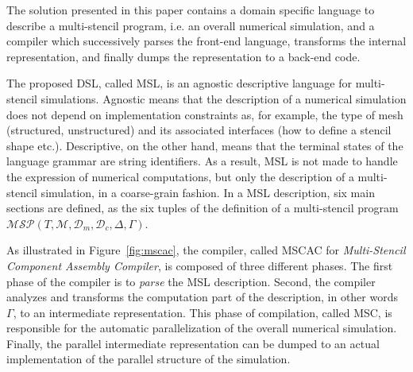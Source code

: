 The solution presented in this paper contains a domain specific language to describe a multi-stencil program, i.e. an overall numerical simulation, and a compiler which successively parses the front-end language, transforms the internal representation, and finally dumps the representation to a back-end code.

The proposed DSL, called MSL, is an agnostic descriptive language for multi-stencil simulations. Agnostic means that the description of a numerical simulation does not depend on implementation constraints as, for example, the type of mesh (structured, unstructured) and its associated interfaces (how to define a stencil shape etc.). Descriptive, on the other hand, means that the terminal states of the language grammar are string identifiers. As a result, MSL is not made to handle the expression of numerical computations, but only the description of a multi-stencil simulation, in a coarse-grain fashion. In a MSL description, six main sections are defined, as the six tuples of the definition of a multi-stencil program $\mathcal{MSP}(T,\mathcal{M},\mathcal{D}_m,\mathcal{D}_c,\Delta,\Gamma)$.

As illustrated in Figure~\ref{fig:mscac}, the compiler, called MSCAC for \emph{Multi-Stencil Component Assembly Compiler}, is composed of three different phases. The first phase of the compiler is to \emph{parse} the MSL description. Second, the compiler analyzes and transforms the computation part of the description, in other words $\Gamma$, to an intermediate representation. This phase of compilation, called MSC, is responsible for the automatic parallelization of the overall numerical simulation. Finally, the parallel intermediate representation can be dumped to an actual implementation of the parallel structure of the simulation.

